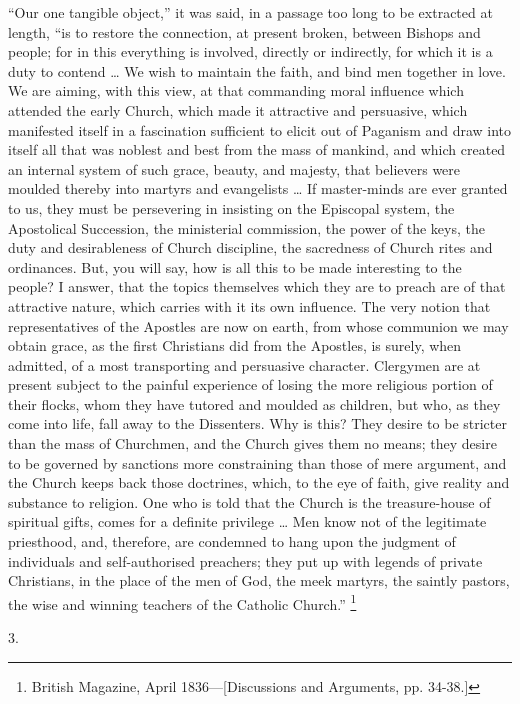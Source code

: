 ``Our one tangible object,'' it was said, in a passage too
long to be extracted at length, ``is to restore the connection, at
present broken, between Bishops and people; for in this everything is
involved, directly or indirectly, for which it is a duty to contend
… We wish to maintain the faith, and bind men together in love. We
are aiming, with this view, at that commanding moral influence which
attended the early Church, which made it attractive and persuasive,
which manifested itself in a fascination sufficient to elicit out of
Paganism and draw into itself all that was noblest and best from the
mass of mankind, and which created an internal system of such grace,
beauty, and majesty, that believers were moulded thereby into martyrs
and evangelists … If master-minds are ever granted to us, they must
be persevering in insisting on the Episcopal system, the Apostolical
Succession, the ministerial commission, the power of the keys, the
duty and desirableness of Church discipline, the sacredness of Church
rites and ordinances. But, you will say, how is all this to be made
interesting to the people? I answer, that the topics themselves which
they are to preach are of that attractive nature, which carries with
it its own influence. The very notion that representatives of the
Apostles are now on earth, from whose communion we may obtain grace,
as the first Christians did from the Apostles, is surely, when
admitted, of a most transporting and persuasive character. Clergymen
are at present subject to the painful experience of losing the more
religious portion of their flocks, whom they have tutored and moulded
as children, but who, as they come into life, fall away to the
Dissenters. Why is this? They desire to be stricter than the mass of
Churchmen, and the Church gives them no means; they desire to be
governed by sanctions more constraining than those of mere argument,
and the Church keeps back those doctrines, which, to the eye of faith,
give reality and substance to religion. One who is told that the
Church is the treasure-house of spiritual gifts, comes for a definite
privilege … Men know not of the legitimate priesthood, and,
therefore, are condemned to hang upon the judgment of individuals and
self-authorised preachers; they put up with legends of private
Christians, in the place of the men of God, the meek martyrs, the
saintly pastors, the wise and winning teachers of the Catholic
Church.'' \footnote{British Magazine, April 1836—[Discussions and
Arguments, pp.
34-38.]}

3.

